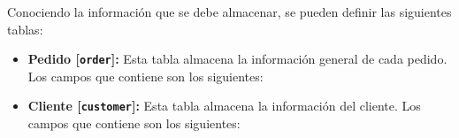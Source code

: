 Conociendo la información que se debe almacenar, se pueden definir las siguientes tablas:

\begin{itemize}
    \item \textbf{Pedido [\texttt{order}]:} Esta tabla almacena la información general de cada pedido. Los campos que contiene son los siguientes:
          

    \item \textbf{Cliente [\texttt{customer}]:} Esta tabla almacena la información del cliente. Los campos que contiene son los siguientes:
\end{itemize}

